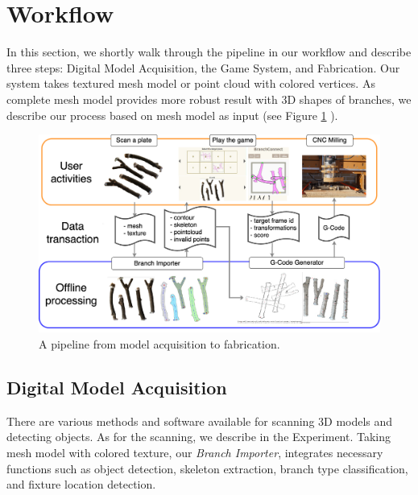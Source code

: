 \section{Workflow}
In this section, we shortly walk through the pipeline in our workflow and describe three steps: Digital Model Acquisition, the Game System, and Fabrication. Our system takes textured mesh model or point cloud with colored vertices. As complete mesh model provides more robust result with 3D shapes of branches, we describe our process based on mesh model as input (see Figure \ref{fig:pipeline} ).

\begin{figure}[ht]
  \begin{center}
    \includegraphics[width = 0.4\paperwidth]{images/workflow/pipeline.png}
    \caption{A pipeline from model acquisition to fabrication.}
    \label{fig:pipeline}
  \end{center}
\end{figure}

\subsection{Digital Model Acquisition}
There are various methods and software available for scanning 3D models and detecting objects.
As for the scanning, we describe in the Experiment.
Taking mesh model with colored texture, our \textit{Branch Importer}, integrates necessary functions such as object detection, skeleton extraction, branch type classification, and fixture location detection.


